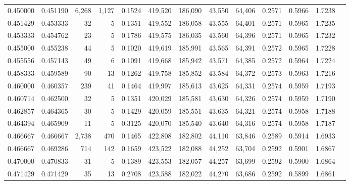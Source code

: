 \begin{tabular}{rrrrrrrrrrrrr}
0.450000 & 0.451190 &  6,268 &  1,127 &                                     0.1524 & 419,520 & 186,090 &  43,550 &  64,406 & 0.2571 & 0.5966 & 1.7238 \\
0.451429 & 0.453333 &     32 &      5 &                                     0.1351 & 419,552 & 186,058 &  43,555 &  64,401 & 0.2571 & 0.5965 & 1.7235 \\
0.453333 & 0.454762 &     23 &      5 &                                     0.1786 & 419,575 & 186,035 &  43,560 &  64,396 & 0.2571 & 0.5965 & 1.7232 \\
0.455000 & 0.455238 &     44 &      5 &                                     0.1020 & 419,619 & 185,991 &  43,565 &  64,391 & 0.2572 & 0.5965 & 1.7228 \\
0.455556 & 0.457143 &     49 &      6 &                                     0.1091 & 419,668 & 185,942 &  43,571 &  64,385 & 0.2572 & 0.5964 & 1.7224 \\
0.458333 & 0.459589 &     90 &     13 &                                     0.1262 & 419,758 & 185,852 &  43,584 &  64,372 & 0.2573 & 0.5963 & 1.7216 \\
0.460000 & 0.460357 &    239 &     41 &                                     0.1464 & 419,997 & 185,613 &  43,625 &  64,331 & 0.2574 & 0.5959 & 1.7193 \\
0.460714 & 0.462500 &     32 &      5 &                                     0.1351 & 420,029 & 185,581 &  43,630 &  64,326 & 0.2574 & 0.5959 & 1.7190 \\
0.462857 & 0.464365 &     30 &      5 &                                     0.1429 & 420,059 & 185,551 &  43,635 &  64,321 & 0.2574 & 0.5958 & 1.7188 \\
0.464394 & 0.465909 &     11 &      5 &                                     0.3125 & 420,070 & 185,540 &  43,640 &  64,316 & 0.2574 & 0.5958 & 1.7187 \\
0.466667 & 0.466667 &  2,738 &    470 &                                     0.1465 & 422,808 & 182,802 &  44,110 &  63,846 & 0.2589 & 0.5914 & 1.6933 \\
0.466667 & 0.469286 &    714 &    142 &                                     0.1659 & 423,522 & 182,088 &  44,252 &  63,704 & 0.2592 & 0.5901 & 1.6867 \\
0.470000 & 0.470833 &     31 &      5 &                                     0.1389 & 423,553 & 182,057 &  44,257 &  63,699 & 0.2592 & 0.5900 & 1.6864 \\
0.471429 & 0.471429 &     35 &     13 &                                     0.2708 & 423,588 & 182,022 &  44,270 &  63,686 & 0.2592 & 0.5899 & 1.6861 \\

\end{tabular}
